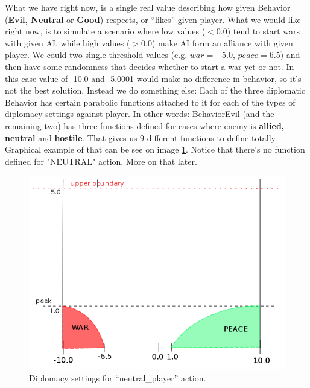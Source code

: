 \begin{par}
	What we have right now, is a single real value describing how given Behavior (\textbf{Evil, Neutral} or \textbf{Good}) respects, or ``likes'' given player.
	What we would like right now, is to simulate a scenario where low values ($ < 0.0$) tend to start wars with given AI, while high values ($> 0.0$) make AI form an alliance with given player.
	We could two single threshold values (e.g. $war = -5.0$, $peace = 6.5$) and then have some randomness that decides whether to start a war yet or not. 
	In this case value of -10.0 and -5.0001 would make no difference in behavior, so it's not the best solution.
	Instead we do something else:
	Each of the three diplomatic Behavior has certain parabolic functions attached to it for each of the types of diplomacy settings against player.
	In other words: BehaviorEvil (and the remaining two) has three functions defined for cases where enemy is \textbf{allied, neutral} and \textbf{hostile}.
	That gives us 9 different functions to define totally. Graphical example of that can be see on image \ref{fig:diplomacy1}. Notice that there's no function defined for "NEUTRAL" action. More on that later.
\end{par}

\begin{figure}[h!]
	\centering
	\includegraphics[width=\textwidth]{gfx/diplomacy1.png}
	\caption{Diplomacy settings for ``neutral\_player'' action.}
	\label{fig:diplomacy1}
\end{figure}

